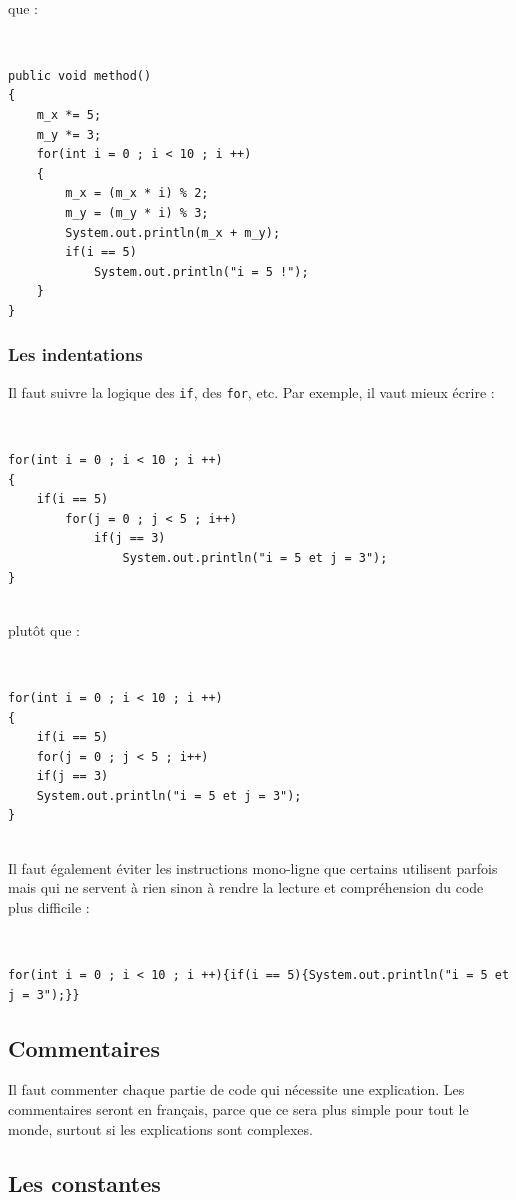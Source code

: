 \documentclass[11pt]{report}
\begin{document}
~\\
que :

~\
\begin{lstlisting}
public void method()
{
	m_x *= 5;
	m_y *= 3;
	for(int i = 0 ; i < 10 ; i ++)
	{
		m_x = (m_x * i) % 2;
		m_y = (m_y * i) % 3;
		System.out.println(m_x + m_y);
		if(i == 5)
			System.out.println("i = 5 !");
	}
}
\end{lstlisting}

\subsubsection{Les indentations}

Il faut suivre la logique des \verb|if|, des \verb|for|, etc. Par exemple, il vaut mieux écrire :

~\
\begin{lstlisting}
for(int i = 0 ; i < 10 ; i ++)
{
	if(i == 5)
		for(j = 0 ; j < 5 ; i++)
			if(j == 3)
				System.out.println("i = 5 et j = 3");
}
\end{lstlisting}

~\\
plutôt que :

~\
\begin{lstlisting}
for(int i = 0 ; i < 10 ; i ++)
{
	if(i == 5)
	for(j = 0 ; j < 5 ; i++)
	if(j == 3)
	System.out.println("i = 5 et j = 3");
}
\end{lstlisting}

~\\
Il faut également éviter les instructions mono-ligne que certains utilisent parfois mais qui ne servent à rien sinon à rendre la lecture et compréhension du code plus difficile :

~\
\begin{lstlisting}
for(int i = 0 ; i < 10 ; i ++){if(i == 5){System.out.println("i = 5 et j = 3");}}
\end{lstlisting}

\subsection{Commentaires}

Il faut commenter chaque partie de code qui nécessite une explication. Les commentaires seront en français, parce que ce sera plus simple pour tout le monde, surtout si les explications sont complexes.

\subsection{Les constantes}
\end{document}
